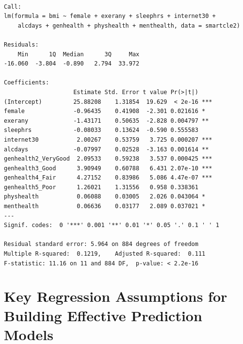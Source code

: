 \documentclass[]{book}
\theoremstyle{definition}
\theoremstyle{definition}
\theoremstyle{definition}
\theoremstyle{remark}
\begin{document}
\begin{verbatim}

Call:
lm(formula = bmi ~ female + exerany + sleephrs + internet30 + 
    alcdays + genhealth + physhealth + menthealth, data = smartcle2)

Residuals:
    Min      1Q  Median      3Q     Max 
-16.060  -3.804  -0.890   2.794  33.972 

Coefficients:
                    Estimate Std. Error t value Pr(>|t|)    
(Intercept)         25.88208    1.31854  19.629  < 2e-16 ***
female              -0.96435    0.41908  -2.301 0.021616 *  
exerany             -1.43171    0.50635  -2.828 0.004797 ** 
sleephrs            -0.08033    0.13624  -0.590 0.555583    
internet30           2.00267    0.53759   3.725 0.000207 ***
alcdays             -0.07997    0.02528  -3.163 0.001614 ** 
genhealth2_VeryGood  2.09533    0.59238   3.537 0.000425 ***
genhealth3_Good      3.90949    0.60788   6.431 2.07e-10 ***
genhealth4_Fair      4.27152    0.83986   5.086 4.47e-07 ***
genhealth5_Poor      1.26021    1.31556   0.958 0.338361    
physhealth           0.06088    0.03005   2.026 0.043064 *  
menthealth           0.06636    0.03177   2.089 0.037021 *  
---
Signif. codes:  0 '***' 0.001 '**' 0.01 '*' 0.05 '.' 0.1 ' ' 1

Residual standard error: 5.964 on 884 degrees of freedom
Multiple R-squared:  0.1219,    Adjusted R-squared:  0.111 
F-statistic: 11.16 on 11 and 884 DF,  p-value: < 2.2e-16
\end{verbatim}

\section{Key Regression Assumptions for Building Effective Prediction
Models}\label{key-regression-assumptions-for-building-effective-prediction-models}
\end{document}
